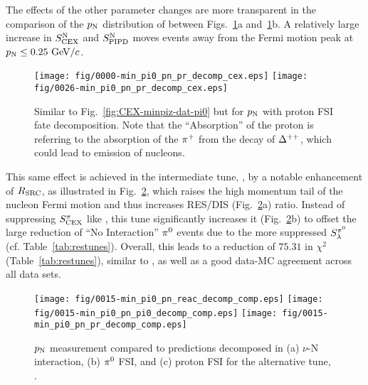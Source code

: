    The effects of the other parameter changes are more transparent in the comparison of the $p_\textrm{N}$ distribution of \minpiz between Figs.~\ref{fig:minpiz-pn-pr}a and~\ref{fig:minpiz-pn-pr}b.
    A relatively large increase in $S_\textrm{CEX}^\textrm{N}$ and $S_\textrm{PIPD}^\textrm{N}$ moves events away from the Fermi motion peak at $p_\textrm{N}\leq0.25~\textrm{GeV}/c$. 
    \begin{figure}[!htb] 	
        \centering 		
        \texttt{[image: fig/0000-min\_pi0\_pn\_pr\_decomp\_cex.eps]}
        \texttt{[image: fig/0026-min\_pi0\_pn\_pr\_decomp\_cex.eps]}	
        \caption{\label{fig:minpiz-pn-pr} Similar to Fig.~\ref{fig:CEX-minpiz-dat-pi0} but for $p_\textrm{N}$ with proton FSI fate decomposition. Note that the ``Absorption'' of the proton is referring to the absorption of the $\pi^+$ from the decay of $\Delta^{++}$, which could lead to emission of nucleons.     
        } 
    \end{figure}
    This same effect is achieved in the intermediate tune, \gT, by a notable enhancement of $R_\textrm{SRC}$, as illustrated in Fig.~\ref{fig:minpiz-alttune}, which raises the high momentum tail of the nucleon Fermi motion and thus increases RES/DIS (Fig.~\ref{fig:minpiz-alttune}a) ratio.
    Instead of suppressing $S_\textrm{CEX}^{\pi}$ like \gC, this tune significantly increases it (Fig.~\ref{fig:minpiz-alttune}b) to offset the large reduction of ``No Interaction'' $\pi^0$ events due to the more suppressed $S_\lambda^{\pi^{0}}$ (cf. Table~\ref{tab:restunes}).  
    Overall, this leads to a reduction of $75.31$ in $\chi^2$ (Table~\ref{tab:restunes}), similar to \gC, as well as a good data-MC agreement across all data sets. 
    
    \begin{figure}[!htb] 	
        \centering 		
        \texttt{[image: fig/0015-min\_pi0\_pn\_reac\_decomp\_comp.eps]}
        \texttt{[image: fig/0015-min\_pi0\_pn\_pi0\_decomp\_comp.eps]}
        \texttt{[image: fig/0015-min\_pi0\_pn\_pr\_decomp\_comp.eps]}
        \caption{\label{fig:minpiz-alttune} \minpiz $p_\textrm{N}$ measurement compared to \genie predictions decomposed in  (a) $\nu$-N interaction, (b) $\pi^0$ FSI, and (c) proton FSI for the alternative tune, \gT.} 
    \end{figure}
    

